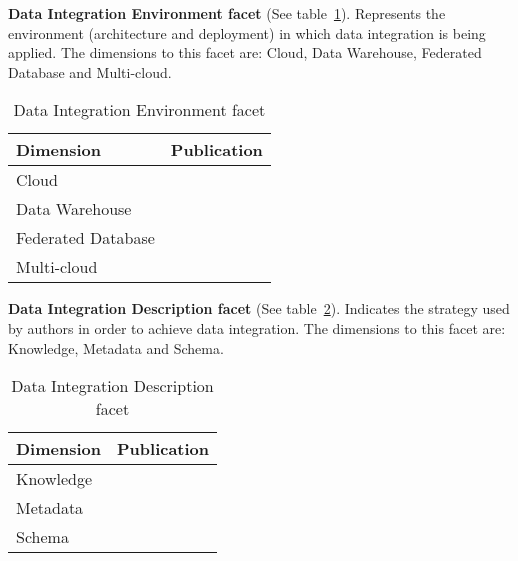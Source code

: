 \textbf{Data Integration Environment facet} (See table~\ref{table:dienviron}). 
Represents the environment (architecture and deployment) in which data integration is being applied.
The dimensions to this facet are: Cloud, Data Warehouse, Federated Database and Multi-cloud.
\begin{table}[h]
\begin{center}
\begin{tabular}{p{4cm}p{10cm}}
\hline 
\textbf{Dimension} & \textbf{Publication} \\ 
\hline 
Cloud & \cite{068,070,072,073,074,075,076,077,078,079,081,082,083,085,087,088,089,090,094,095,096,097,098,099,100,102,103,105,106,107,108,109,110,113}\\ 
\hline 
Data Warehouse & \cite{066,091,114} \\ 
\hline 
Federated Database & \cite{071,089,112} \\ 
\hline 
Multi-cloud & \cite{012,071,093} \\ 
\hline 
\end{tabular}
\end{center}
\caption{Data Integration Environment facet}\label{table:dienviron}
\end{table}

\textbf{Data Integration Description facet} (See table~\ref{table:didesc}).
Indicates the strategy used by authors in order to achieve data integration. 
The dimensions to this facet are: Knowledge, Metadata and Schema.
\begin{table}[h]
\begin{center}
\begin{tabular}{p{4cm}p{10cm}}
\hline 
\textbf{Dimension} & \textbf{Publication} \\ 
\hline 
Knowledge & \cite{012,083} \\ 
\hline 
Metadata & \cite{066,108,113} \\ 
\hline 
Schema & \cite{070,071,072,073,075,083,089,091,102,112,114} \\ 
\hline 
\end{tabular}
\end{center}
\caption{Data Integration Description facet}\label{table:didesc}
\end{table}

